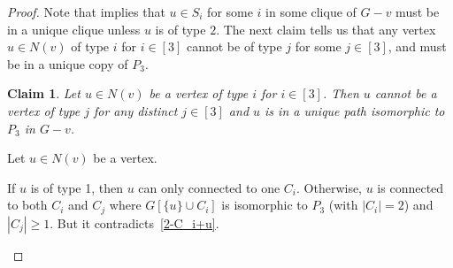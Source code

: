 \documentclass[a4paper,12pt]{article}
\theoremstyle{plain}
\newtheorem{claim}{Claim}[section]
\newenvironment{proof*}{\noindent \emph{Proof of the claim.}}{\hfill$\Diamond$}
\begin{document}
\begin{proof}
Note that  implies that $u\in S_i$ for some $i$ in some clique of $G-v$ must be in a unique clique unless $u$ is of type $2$. The next claim tells us that any vertex $u\in N(v)$ of type $i$ for $i\in [3]$ cannot be of type $j$ for some $j\in [3]$, and must be in a unique copy of $P_3$. 

\begin{claim}\label{claim:uniqueP3}
Let $u\in N(v)$ be a vertex of type $i$ for $i\in [3]$. Then $u$ cannot be a vertex of type $j$ for any distinct $j\in [3]$ and $u$ is in a unique path isomorphic to $P_3$ in $G-v$.  
\end{claim}

\begin{proof*}
Let $u\in N(v)$ be a vertex. 

If $u$ is of type 1, then $u$ can only connected to one $C_i$. Otherwise, $u$ is connected to both $C_i$ and $C_j$ where $G[\{u\}\cup C_i]$ is isomorphic to $P_3$ (with $|C_i|=2$) and $|C_j|\geq 1$. But it contradicts~\ref{2-C_i+u}.


\end{proof*}
\end{proof}
\end{document}

